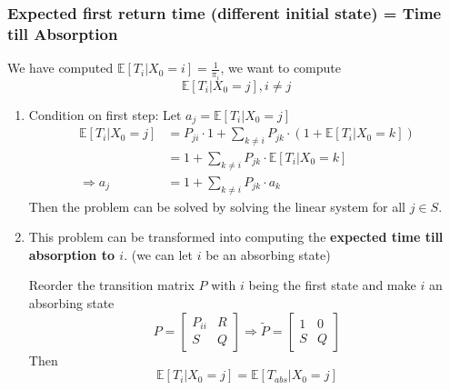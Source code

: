 \documentclass[11pt,a4paper]{article}
\begin{document}
\subsubsection{Expected first return time (different initial state) = Time till Absorption}
We have computed $\mathbb{E}[T_i|X_0=i]=\frac{1}{\pi_i}$, we want to compute $$\mathbb{E}[T_i|X_0=j],i\neq j$$
\begin{enumerate}
    \item Condition on first step: Let $a_j=\mathbb{E}[T_i|X_0=j]$
    \begin{equation}
        \begin{aligned}
            \mathbb{E}[T_i|X_0=j]&=P_{ji}\cdot 1+\sum_{k\neq i}P_{jk}\cdot(1+\mathbb{E}[T_i|X_0=k])\\
            &=1+\sum_{k\neq i}P_{jk}\cdot\mathbb{E}[T_i|X_0=k]\\
            \Rightarrow a_j&=1+\sum_{k\neq i}P_{jk}\cdot a_k
        \end{aligned}
        \nonumber
    \end{equation}
    Then the problem can be solved by solving the linear system for all $j\in S$.
    \item This problem can be transformed into computing the \textbf{expected time till absorption to $i$}. (we can let $i$ be an absorbing state)

    Reorder the transition matrix $P$ with $i$ being the first state and make $i$ an absorbing state $$P=\begin{bmatrix}
        P_{ii}& R\\
        S & Q
    \end{bmatrix} \Rightarrow \tilde{P}=\begin{bmatrix}
        1&0\\
        S&Q
    \end{bmatrix}$$
    Then $$\mathbb{E}[T_i|X_0=j]=\mathbb{E}[T_{abs}|X_0=j]$$
\end{enumerate}
\end{document}
